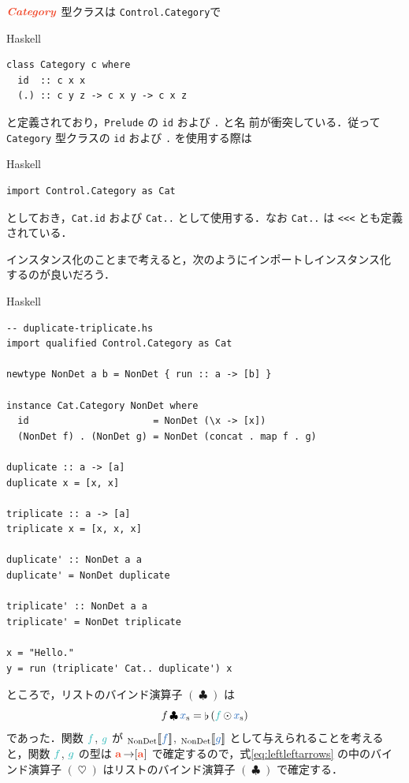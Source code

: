 \documentclass[a5paper,twoside,fleqn,draft]{jsbook}
\def\[{[\![}
\def\]{]\!]}
\def\varColor{NavyBlue}
\def\funcColor{BlueGreen}
\def\typeColor{RedOrange}
\newcommand{\programminglanguage}[1]{\textsf{#1}}
\newcommand{\haskell}{\programminglanguage{Haskell}}
\newcommand{\code}[1]{\texttt{#1}}
\newcommand{\filename}[1]{\texttt{#1}}
\newenvironment{haskellcode}{\begin{itembox}[r]{\haskell}}{\end{itembox}}
\newcommand{\mVar}[1]{\textcolor{\varColor}{#1}}
\newcommand{\mFunc}[1]{\textcolor{\funcColor}{#1}}
\newcommand{\mFFunc}{{\mFunc{f}}}
\newcommand{\mGFunc}{\mFunc{g}}
\DeclareMathOperator{\mBind}{\heartsuit}
\DeclareMathOperator{\mBindList}{\clubsuit}
\DeclareMathOperator{\mFuncArrow}{\rightarrow}
\DeclareMathOperator{\mJoinList}{\flat} %
\DeclareMathOperator{\mMapList}{\odot}
\newcommand{\mType}[1]{\textcolor{\typeColor}{\mathbf{#1}}}
\newcommand{\mA}{\mType{a}}
\newcommand{\mValueConstructor}[1]{\mathrm{#1}}
\newcommand{\mValueWith}[2]{{}_\mValueConstructor{#1}\[\mVar{#2}\]}
\newcommand{\mTypeClass}[1]{\textcolor{\typeColor}{\textbf{\textit{#1}}}}
\newcommand{\mCatTypeClass}{\mTypeClass{Category}}
\newcommand{\mList}[1]{\mVar{#1}_\mathrm{s}}
\begin{document}
$\mCatTypeClass$ 型クラスは \filename{Control.Category}で
\begin{haskellcode}
\begin{verbatim}
class Category c where
  id  :: c x x
  (.) :: c y z -> c x y -> c x z
\end{verbatim}
\end{haskellcode}
と定義されており，\filename{Prelude} の \code{id} および \code{.} と名
前が衝突している．従って \code{Category} 型クラスの \code{id} および
\code{.} を使用する際は
\begin{haskellcode}
\begin{verbatim}
import Control.Category as Cat
\end{verbatim}
\end{haskellcode}
としておき，\code{Cat.id} および \code{Cat..} として使用する．なお
\code{Cat..} は \code{<<<} とも定義されている．

インスタンス化のことまで考えると，次のようにインポートしインスタンス化
するのが良いだろう．
\begin{haskellcode}
\begin{verbatim}
-- duplicate-triplicate.hs
import qualified Control.Category as Cat

newtype NonDet a b = NonDet { run :: a -> [b] }

instance Cat.Category NonDet where
  id                      = NonDet (\x -> [x])
  (NonDet f) . (NonDet g) = NonDet (concat . map f . g)

duplicate :: a -> [a]
duplicate x = [x, x]

triplicate :: a -> [a]
triplicate x = [x, x, x]

duplicate' :: NonDet a a
duplicate' = NonDet duplicate

triplicate' :: NonDet a a
triplicate' = NonDet triplicate

x = "Hello."
y = run (triplicate' Cat.. duplicate') x
\end{verbatim}
\end{haskellcode}

ところで，リストのバインド演算子 $(\mBindList)$ は
\begin{equation}
  f\mBindList\mList{x}
  =\mJoinList{}(\mFFunc\mMapList\mList{x})
  \label{eq:leftleftarrows}
\end{equation}
であった．関数 $\mFFunc$, $\mGFunc$ が $\mValueWith{NonDet}{f}$,
$\mValueWith{NonDet}{g}$ として与えられることを考えると，関数 $\mFFunc$, $\mGFunc$
の型は $\mA\mFuncArrow[\mA]$ で確定するので，式\eqref{eq:leftleftarrows}
の中のバインド演算子 $(\mBind)$ はリストのバインド演算子
$(\mBindList)$ で確定する．
\end{document}
